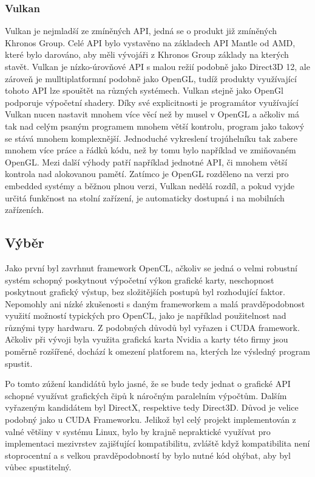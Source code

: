 \subsubsection{Vulkan}
Vulkan je nejmladší ze zmíněných API, jedná se o produkt již zmíněných Khronos Group. Celé API bylo vystavěno na základech API Mantle od AMD, které bylo darováno, aby měli vývojáři z Khronos Group základy na kterých stavět. Vulkan je nízko-úrovňové API s malou režií podobně jako Direct3D 12, ale zároveň je mulltiplatformní podobně jako OpenGL, tudíž produkty využívající tohoto API lze spouštět na různých systémech. Vulkan stejně jako OpenGl podporuje výpočetní shadery. Díky své explicitnosti je programátor využívající Vulkan nucen nastavit mnohem více věcí než by musel v OpenGL a ačkoliv má tak nad celým psaným programem mnohem větší kontrolu, program jako takový se stává mnohem komplexnější. Jednoduché vykreslení trojúhelníku tak zabere mnohem více práce a řádků kódu, než by tomu bylo například ve zmiňovaném OpenGL. Mezi další výhody patří například jednotné API, či mnohem větší kontrola nad alokovanou pamětí. Zatímco je OpenGL rozděleno na verzi pro embedded systémy a běžnou plnou verzi, Vulkan nedělá rozdíl, a pokud vyjde určitá funkčnost na stolní zařízení, je automaticky dostupná i na mobilních zařízeních. \cite{singh2016learning}

\subsection{Výběr}
Jako první byl zavrhnut framework OpenCL, ačkoliv se jedná o velmi robustní systém schopný poskytnout výpočetní výkon grafické karty, neschopnost poskytnout grafický výstup, bez složitějších postupů byl rozhodující faktor. Nepomohly ani nízké zkušenosti s daným frameworkem a malá pravděpodobnost využití možností typických pro OpenCL, jako je například použitelnost nad různými typy hardwaru. Z podobných důvodů byl vyřazen i CUDA framework. Ačkoliv při vývoji byla využita grafická karta Nvidia a karty této firmy jsou poměrně rozšířené, dochází k omezení platforem na, kterých lze výsledný program spustit.

Po tomto zúžení kandidátů bylo jasné, že se bude tedy jednat o grafické API schopné využívat grafických čipů k náročným paralelním výpočtům. Dalším vyřazeným kandidátem byl DirectX, respektive tedy Direct3D. Důvod je velice podobný jako u CUDA Frameworku. Jelikož byl celý projekt implementován z valné většiny v systému Linux, bylo by krajně nepraktické využívat pro implementaci mezivrstev zajišťující kompatibilitu, zvláště když kompatibilita není stoprocentní a s velkou pravděpodobností by bylo nutné kód ohýbat, aby byl vůbec spustitelný. 

